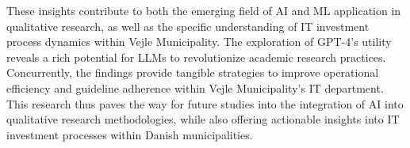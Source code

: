 \documentclass[
]{book}
\begin{document}
These insights contribute to both the emerging field of AI and ML application in qualitative research, as well as the specific understanding of IT investment process dynamics within Vejle Municipality. The exploration of GPT-4's utility reveals a rich potential for LLMs to revolutionize academic research practices. Concurrently, the findings provide tangible strategies to improve operational efficiency and guideline adherence within Vejle Municipality's IT department. This research thus paves the way for future studies into the integration of AI into qualitative research methodologies, while also offering actionable insights into IT investment processes within Danish municipalities.

\backmatter
\end{document}
